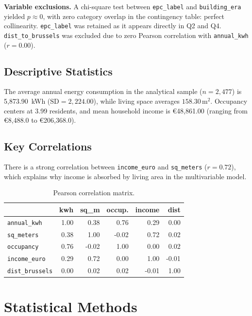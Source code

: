 \documentclass[11pt, a4paper]{article}
\begin{document}
\textbf{Variable exclusions.} A chi-square test between \texttt{epc\_label} and \texttt{building\_era} yielded $p \approx 0$, with zero category overlap in the contingency table: perfect collinearity. \texttt{epc\_label} was retained as it appears directly in Q2 and Q4. \texttt{dist\_to\_brussels} was excluded due to zero Pearson correlation with \texttt{annual\_kwh} ($r = 0.00$).

\subsection{Descriptive Statistics}\label{subsec:descriptive}
The average annual energy consumption in the analytical sample ($n = 2{,}477$) is 5,873.90~kWh ($\text{SD} = 2{,}224.00$), while living space averages $158.30\,\text{m}^2$. Occupancy centers at 3.99 residents, and mean household income is €48,861.00 (ranging from €8,488.0 to €206,368.0).

\subsection{Key Correlations}\label{subsec:correlations}
There is a strong correlation between \texttt{income\_euro} and \texttt{sq\_meters} ($r = 0.72$), which explains why income is absorbed by living area in the multivariable model.

\begin{table}[H]
\centering
\caption{Pearson correlation matrix.}\label{tab:correlation_matrix}
\begin{tabular}{lrrrrr}
\toprule
& \textbf{kwh} & \textbf{sq\_m} & \textbf{occup.} & \textbf{income} & \textbf{dist} \\
\midrule
\texttt{annual\_kwh}    & 1.00 & 0.38 & 0.76  & 0.29 & 0.00 \\
\texttt{sq\_meters}     & 0.38 & 1.00 & -0.02 & 0.72 & 0.02 \\
\texttt{occupancy}      & 0.76 & -0.02 & 1.00 & 0.00 & 0.02 \\
\texttt{income\_euro}   & 0.29 & 0.72 & 0.00  & 1.00 & -0.01 \\
\texttt{dist\_brussels} & 0.00 & 0.02 & 0.02  & -0.01 & 1.00 \\
\bottomrule
\end{tabular}
\end{table}

\section{Statistical Methods}\label{sec:methods}
\end{document}
